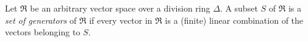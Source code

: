 Let $\Re$ be an arbitrary vector space over a division ring $\Delta$. A subset $S$ of $\Re$ is a \textit{set of generators} of $\Re$ if every vector in $\Re$ is a (finite) linear combination of the vectors belonging to $S$.
